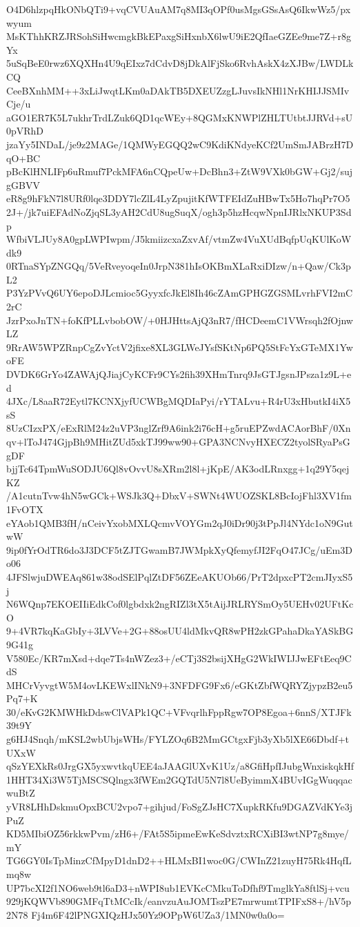 O4D6hlzpqHkONbQTi9+vqCVUAuAM7q8MI3qOPf0usMgsGSsAsQ6IkwWz5/pxwyum
MsKThhKRZJRSohSiHwcmgkBkEPaxgSiHxnbX6lwU9iE2QfIaeGZEe9me7Z+r8gYx
5uSqBeE0rwz6XQXHn4U9qEIxz7dCdvD8jDkAlFjSko6RvhAskX4zXJBw/LWDLkCQ
CeeBXnhMM++3xLiJwqtLKm0aDAkTB5DXEUZzgLJuvsIkNHl1NrKHIJJSMIvCje/u
aGO1ER7K5L7ukhrTrdLZuk6QD1qcWEy+8QGMxKNWPlZHLTUtbtJJRVd+sU0pVRhD
jzaYy5INDaL/je9z2MAGe/1QMWyEGQQ2wC9KdiKNdyeKCf2UmSmJABrzH7DqO+BC
pBcKlHNLIFp6uRmuf7PckMFA6nCQpeUw+DcBhn3+ZtW9VXk0bGW+Gj2/sujgGBVV
eR8g9hFkN7l8URf0lqe3DDY7lcZlL4LyZpujitKfWTFEIdZuHBwTx5Ho7hqPr7O5
2J+/jk7uiEFAdNoZjqSL3yAH2CdU8ugSuqX/ogh3p5hzHcqwNpnIJRlxNKUP3Sdp
WfbiVLJUy8A0gpLWPIwpm/J5kmiizcxaZxvAf/vtmZw4VuXUdBqfpUqKUlKoWdk9
0RTnaSYpZNGQq/5VeRveyoqeIn0JrpN381hIsOKBmXLaRxiDIzw/n+Qaw/Ck3pL2
P3YzPVvQ6UY6epoDJLcmioc5GyyxfcJkEl8Ih46cZAmGPHGZGSMLvrhFVI2mC2rC
JzrPxoJnTN+foKfPLLvbobOW/+0HJHttsAjQ3nR7/fHCDeemC1VWrsqh2fOjnwLZ
9RrAW5WPZRnpCgZvYctV2jfixe8XL3GLWeJYsfSKtNp6PQ5StFcYxGTeMX1YwoFE
DVDK6GrYo4ZAWAjQJiajCyKCFr9CYs2fih39XHmTnrq9JsGTJgsnJPsza1z9L+ed
4JXc/L8aaR72Eytl7KCNXjyfUCWBgMQDIaPyi/rYTALvu+R4rU3xHbutkI4iX5sS
8UzCIzxPX/eExRlM24z2uVP3nglZrf9A6ink2i76cH+g5ruEPZwdACAorBhF/0Xn
qv+lToJ474GjpBh9MHitZUd5xkTJ99ww90+GPA3NCNvyHXECZ2tyolSRyaPsGgDF
bjjTc64TpmWuSODJU6Ql8vOvvU8sXRm2l8l+jKpE/AK3odLRnxgg+1q29Y5qejKZ
/A1cutnTvw4hN5wGCk+WSJk3Q+DbxV+SWNt4WUOZSKL8BcIojFhl3XV1fm1FvOTX
eYAob1QMB3fH/nCeivYxobMXLQcmvVOYGm2qJ0iDr90j3tPpJl4NYdc1oN9GutwW
9ip0fYrOdTR6do3J3DCF5tZJTGwamB7JWMpkXyQfemyfJI2FqO47JCg/uEm3Do06
4JFSlwjuDWEAq861w38odSElPqlZtDF56ZEeAKUOb66/PrT2dpxcPT2cmJIyxS5j
N6WQnp7EKOEIIiEdkCof0lgbdxk2ngRIZl3tX5tAijJRLRYSmOy5UEHv02UFtKcO
9+4VR7kqKaGbIy+3LVVe+2G+88osUU4ldMkvQR8wPH2zkGPahaDkaYASkBG9G41g
V580Ec/KR7mXsd+dqe7Ts4nWZez3+/eCTj3S2bsijXHgG2WkIWIJJwEFtEeq9CdS
MHCrVyvgtW5M4ovLKEWxlINkN9+3NFDFG9Fx6/eGKtZbfWQRYZjypzB2eu5Pq7+K
30/eKvG2KMWHkDdswClVAPk1QC+VFvqrlhFppRgw7OP8Egoa+6nnS/XTJFk39t9Y
g6HJ4Snqh/mKSL2wbUbjsWHs/FYLZOq6B2MmGCtgxFjb3yXb5lXE66Dbdf+tUXxW
qSzYEXkRs0JrgGX5yxwvtkqUEE4aJAAGlUXvK1Uz/a8GfiHpfIJubgWnxiskqkHf
1HHT34Xi3W5TjMSCSQlngx3fWEm2GQTdU5N7l8UeByimmX4BUvIGgWuqqacwuBtZ
yVR8LHhDskmuOpxBCU2vpo7+gihjud/FoSgZJsHC7XupkRKfu9DGAZVdKYe3jPuZ
KD5MIbiOZ56rkkwPvm/zH6+/FAt5S5ipmeEwKeSdvztxRCXiBI3wtNP7g8mye/mY
TG6GY0IsTpMinzCfMpyD1dnD2++HLMxBI1woc0G/CWInZ21zuyH75Rk4HqfLmq8w
UP7bcXI2f1NO6web9tl6aD3+nWPI8ub1EVKcCMkuToDfhf9TmglkYa8ftlSj+vcu
929jKQWVb890GMFqTtMCcIk/eanvzuAuJOMTszPE7mrwumtTPIFxS8+/hV5p2N78
Fj4m6F42lPNGXIQzHJx50Yz9OPpW6UZa3/1MN0w0a0o=
